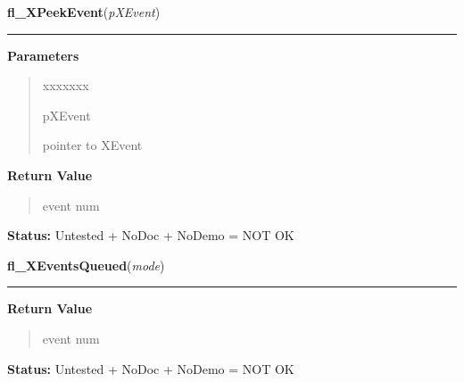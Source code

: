\hspace{.8\funcindent}\begin{boxedminipage}{\funcwidth}

    \raggedright \textbf{fl\_XPeekEvent}(\textit{pXEvent})

    \vspace{-1.5ex}

    \rule{\textwidth}{0.5\fboxrule}
\setlength{\parskip}{2ex}
\setlength{\parskip}{1ex}
      \textbf{Parameters}
      \vspace{-1ex}

      \begin{quote}
        \begin{Ventry}{xxxxxxx}

          \item[pXEvent]

          pointer to XEvent

        \end{Ventry}

      \end{quote}

      \textbf{Return Value}
    \vspace{-1ex}

      \begin{quote}
      event num

      \end{quote}

\textbf{Status:} Untested + NoDoc + NoDemo = NOT OK



    \end{boxedminipage}

    \label{xformslib:library:fl_XEventsQueued}

    \vspace{0.5ex}

\hspace{.8\funcindent}\begin{boxedminipage}{\funcwidth}

    \raggedright \textbf{fl\_XEventsQueued}(\textit{mode})

    \vspace{-1.5ex}

    \rule{\textwidth}{0.5\fboxrule}
\setlength{\parskip}{2ex}
\setlength{\parskip}{1ex}
      \textbf{Return Value}
    \vspace{-1ex}

      \begin{quote}
      event num

      \end{quote}

\textbf{Status:} Untested + NoDoc + NoDemo = NOT OK



    \end{boxedminipage}

